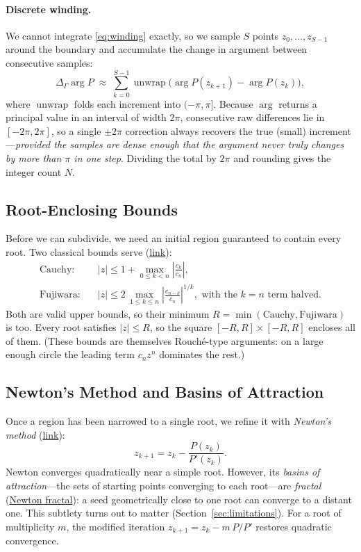 \documentclass[11pt]{article}
\begin{document}
\paragraph{Discrete winding.} We cannot integrate \eqref{eq:winding} exactly, so
we sample $S$ points $z_0,\dots,z_{S-1}$ around the boundary and accumulate the
change in argument between consecutive samples:
\begin{equation}
  \Delta_\Gamma \arg P \;\approx\; \sum_{k=0}^{S-1}
     \operatorname{unwrap}\!\big(\arg P(z_{k+1}) - \arg P(z_k)\big),
  \label{eq:discrete}
\end{equation}
where $\operatorname{unwrap}$ folds each increment into $(-\pi,\pi]$. Because
$\arg$ returns a principal value in an interval of width $2\pi$, consecutive raw
differences lie in $[-2\pi,2\pi]$, so a single $\pm 2\pi$ correction always
recovers the true (small) increment---\emph{provided the samples are dense
enough that the argument never truly changes by more than $\pi$ in one step}.
Dividing the total by $2\pi$ and rounding gives the integer count $N$.

\subsection{Root-Enclosing Bounds}
Before we can subdivide, we need an initial region guaranteed to contain every
root. Two classical bounds serve
(\href{https://en.wikipedia.org/wiki/Properties_of_polynomial_roots}{link}):
\begin{align}
  \text{Cauchy:} &\quad |z| \le 1 + \max_{0 \le k < n} \left|\frac{c_k}{c_n}\right|,\\
  \text{Fujiwara:} &\quad |z| \le 2\,\max_{1 \le k \le n}
     \left|\frac{c_{n-k}}{c_n}\right|^{1/k}, \text{ with the $k=n$ term halved.}
\end{align}
Both are valid upper bounds, so their minimum $R = \min(\text{Cauchy},
\text{Fujiwara})$ is too. Every root satisfies $|z| \le R$, so the square
$[-R,R]\times[-R,R]$ encloses all of them. (These bounds are themselves
Rouch\'e-type arguments: on a large enough circle the leading term $c_n z^n$
dominates the rest.)

\subsection{Newton's Method and Basins of Attraction}
Once a region has been narrowed to a single root, we refine it with
\emph{Newton's method}
(\href{https://en.wikipedia.org/wiki/Newton\%27s_method}{link}):
\begin{equation}
  z_{k+1} = z_k - \frac{P(z_k)}{P'(z_k)}.
\end{equation}
Newton converges quadratically near a simple root. However, its
\emph{basins of attraction}---the sets of starting points converging to each
root---are \emph{fractal}
(\href{https://en.wikipedia.org/wiki/Newton_fractal}{Newton fractal}): a seed
geometrically close to one root can converge to a distant one. This subtlety
turns out to matter (Section~\ref{sec:limitations}). For a root of multiplicity
$m$, the modified iteration $z_{k+1} = z_k - m\,P/P'$ restores quadratic
convergence.
\end{document}
